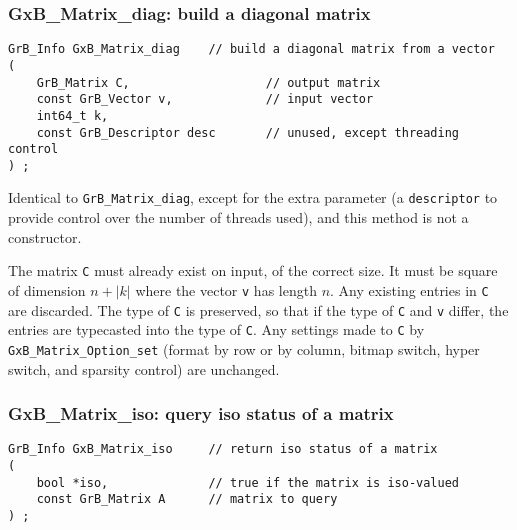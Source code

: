 \documentclass[12pt]{article}
\begin{document}
\subsubsection{{\sf GxB\_Matrix\_diag:} build a diagonal matrix}
\label{matrix_diag_GxB}

\begin{mdframed}[userdefinedwidth=6in]
{\footnotesize
\begin{verbatim}
GrB_Info GxB_Matrix_diag    // build a diagonal matrix from a vector
(
    GrB_Matrix C,                   // output matrix
    const GrB_Vector v,             // input vector
    int64_t k,
    const GrB_Descriptor desc       // unused, except threading control
) ;
\end{verbatim} } \end{mdframed}

Identical to \verb'GrB_Matrix_diag', except for the extra parameter
(a \verb'descriptor' to provide control over the number of threads used),
and this method is not a constructor.

The matrix \verb'C' must already exist on input, of the correct size.  It must
be square of dimension $n+|k|$ where the vector \verb'v' has length $n$.  Any
existing entries in \verb'C' are discarded.  The type of \verb'C' is preserved,
so that if the type of \verb'C' and \verb'v' differ, the entries are typecasted
into the type of \verb'C'.  Any settings made to \verb'C' by
\verb'GxB_Matrix_Option_set' (format by row or by column, bitmap switch, hyper
switch, and sparsity control) are unchanged.

\subsubsection{{\sf GxB\_Matrix\_iso:} query iso status of a matrix}
\label{matrix_iso}

\begin{mdframed}[userdefinedwidth=6in]
{\footnotesize
\begin{verbatim}
GrB_Info GxB_Matrix_iso     // return iso status of a matrix
(
    bool *iso,              // true if the matrix is iso-valued
    const GrB_Matrix A      // matrix to query
) ;
\end{verbatim} } \end{mdframed}
\end{document}

